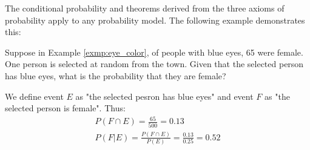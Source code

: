 The conditional probability and theorems derived from the three axioms of probability apply to any probability model.
The following example demonstrates this:

\begin{exmp}
	Suppose in Example \autoref{exmp:eye_color}, of people with blue eyes, 65 were female.
	One person is selected at random from the town.
	Given that the selected person has blue eyes, what is the probability that they are female?
\end{exmp}
\begin{solution}
	We define event \( E \) as "the selected pesron has blue eyes" and event \( F \) as "the selected person is female".
	Thus:
	\begin{gather*}
		P(F \cap E) = \frac{65}{500} = 0.13\\
		P(F | E) = \frac{P(F \cap E)}{P(E)} = \frac{0.13}{0.25} = 0.52
	\end{gather*}
\end{solution}